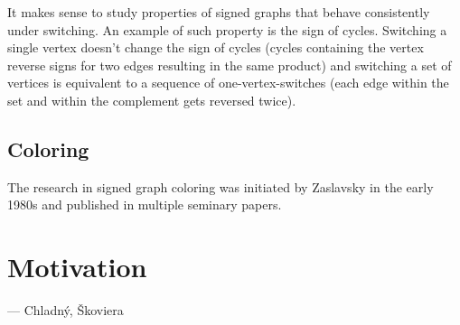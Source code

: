It makes sense to study properties of signed graphs that behave consistently under switching. An example of such property is the sign of cycles. Switching a single vertex doesn't change the sign of cycles (cycles containing the vertex reverse signs for two edges resulting in the same product) and switching a set of vertices is equivalent to a sequence of one-vertex-switches (each edge within the set and within the complement gets reversed twice).

\subsection{Coloring}

The research in signed graph coloring was initiated by Zaslavsky\cite{zaslavsky-graphs} in the early 1980s and published in multiple seminary papers\cite{zaslavsky-invariants,zaslavsky-coloring,zaslavsky-colorful}.

\section{Motivation}

 --- Chladný, Škoviera \cite{skoviera-citat}

\todo{}
